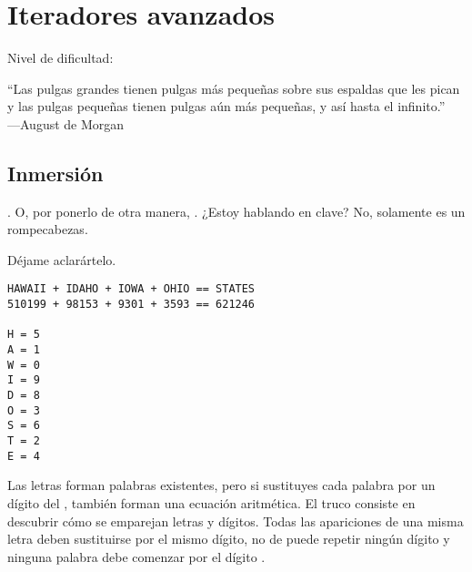 
\chapter{Iteradores avanzados}\label{ch:iteravan}

\noindent
Nivel de dificultad:\difllll

\begin{citaCap}
``Las pulgas grandes tienen pulgas más pequeñas sobre sus espaldas que les pican \\
y las pulgas pequeñas tienen pulgas aún más pequeñas, y así hasta el infinito.''\\
---August de Morgan
\end{citaCap}

\section{Inmersión}

. O, por ponerlo de otra manera, . ¿Estoy hablando en clave? No, solamente es un rompecabezas.

Déjame aclarártelo.

\noindent\begin{minipage}{\textwidth}
\begin{lstlisting}[mathescape=True]
HAWAII + IDAHO + IOWA + OHIO == STATES
510199 + 98153 + 9301 + 3593 == 621246

H = 5
A = 1
W = 0
I = 9
D = 8
O = 3
S = 6
T = 2
E = 4
\end{lstlisting}
\end{minipage}

Las letras forman palabras existentes, pero si sustituyes cada palabra por un dígito del , también forman una ecuación aritmética. El truco consiste en descubrir cómo se emparejan letras y dígitos. Todas las apariciones de una misma letra deben sustituirse por el mismo dígito, no de puede repetir ningún dígito y ninguna palabra debe comenzar por el dígito .


